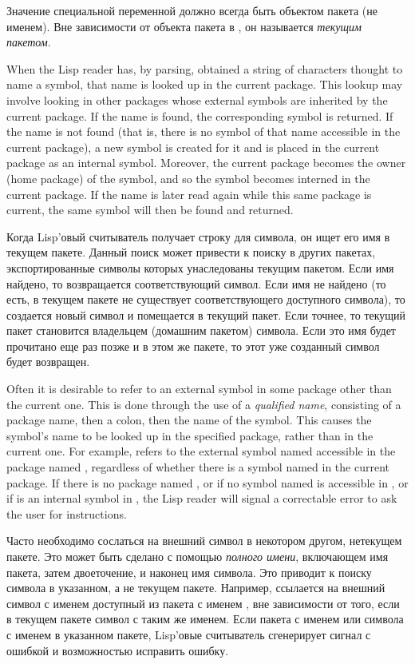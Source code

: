 Значение специальной переменной  должно всегда быть объектом
пакета (не именем). Вне зависимости от объекта пакета в , он
называется \emph{текущим пакетом}.

When the Lisp reader has, by parsing, obtained a string of characters
thought to name a symbol, that name is looked up in the current package.
This lookup may involve looking in other packages whose external symbols
are inherited by the current package.  If the name is found,
the corresponding symbol is returned.  If the name is not found
(that is, there is no symbol of that name accessible in the current package),
a new symbol is created for it and is placed in the current package as an
internal symbol.  Moreover, the current package becomes the owner
(home package) of the symbol, and so the symbol becomes interned
in the current package.
If the name is later read again while this same package is
current, the same symbol will then be found and returned.

Когда Lisp'овый считыватель получает строку для символа, он ищет его имя в
текущем пакете.
Данный поиск может привести к поиску в других пакетах, экспортированные символы
которых унаследованы текущим пакетом. Если имя найдено, то возвращается
соответствующий символ. Если имя не найдено (то есть, в текущем пакете не
существует соответствующего доступного символа), то создается новый символ и
помещается в текущий пакет. Если точнее, то текущий пакет становится владельцем
(домашним пакетом) символа.
Если это имя будет прочитано еще раз позже и в этом же пакете, то этот уже
созданный символ будет возвращен.

Often it is desirable to refer to an external symbol in some package
other than the current one.  This is done through the use of a
\emph{qualified name}, consisting of a package name, then a colon, then the
name of the symbol.  This causes the symbol's name to be looked up
in the specified package, rather than in the current one.  For example,
 refers to the external symbol named 
accessible in the package named , regardless of whether
there is a symbol named  in the current package.  If there
is no package named , or if no symbol named 
is accessible in , or if  is an internal
symbol in , the Lisp reader will signal
a correctable error to ask the user for instructions.

Часто необходимо сослаться на внешний символ в некотором другом, нетекущем
пакете. Это может быть сделано с помощью \emph{полного имени}, включающем имя
пакета, затем двоеточение, и наконец имя символа. Это приводит к поиску символа
в указанном, а не текущем пакете. Например,  ссылается на
внешний символ с именем  доступный из пакета с именем ,
вне зависимости от того, если в текущем пакете символ с таким же именем.
Если пакета с именем  или символа с именем  в указанном
пакете, Lisp'овые считыватель сгенерирует сигнал с ошибкой и возможностью
исправить ошибку.

